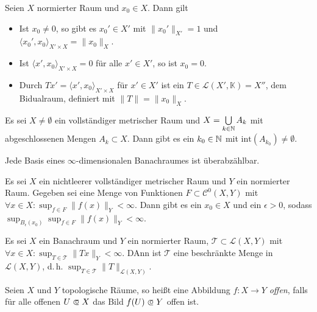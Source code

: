 \documentclass{cheat-sheet}
\newcommand{\K}{\mathbb{K}}
\newcommand{\Leb}{\mathcal{L}} %
\begin{document}
\begin{satz}
  Seien $X$ normierter Raum und $x_0 \in X$. Dann gilt
  \begin{itemize}
    \item  Ist $x_0 \not= 0$, so gibt es $x_0' \in X'$ mit $\|x_0'\|_{X'} = 1$ und $\langle x_0', x_0 \rangle_{X' \times X} = \|x_0\|_X$.
    \item Ist $\langle x', x_0 \rangle_{X' \times X} = 0$ für alle $x' \in X'$, so ist $x_0 = 0$.
    \item Durch $Tx' = \langle x', x_0 \rangle_{X' \times X}$ für $x' \in X'$ ist ein $T \in \mathcal{L}(X', \K) = X''$, dem Bidualraum, definiert mit $\|T\| = \|x_0\|_X$.
  \end{itemize}
\end{satz}



\begin{satz}
  Es sei $X \not= \emptyset$ ein vollständiger metrischer Raum und $X = \bigcup_{k \in \N} A_k$ mit abgeschlossenen Mengen $A_k \subset X$. Dann gibt es ein $k_0 \in \mathbb{N}$ mit $\mathrm{int}(A_{k_0}) \not= \emptyset$.
\end{satz}

\begin{kor}
  Jede Basis eines $\infty$-dimensionalen Banachraumes ist überabzählbar.
\end{kor}

\begin{satz}
  Es sei $X$ ein nichtleerer vollständiger metrischer Raum und $Y$ ein normierter Raum. Gegeben sei eine Menge von Funktionen $F \subset \mathcal{C}^0(X, Y)$ mit $\forall x \in X : \sup_{f \in F} \|f(x)\|_Y < \infty$. Dann gibt es ein $x_0 \in X$ und ein $\epsilon > 0$, sodass $\sup_{B_\epsilon(x_0)} \sup_{f \in F} \|f(x)\|_Y < \infty$.
\end{satz}

\begin{satz}
  Es sei $X$ ein Banachraum und $Y$ ein normierter Raum, $\mathcal{T} \subset \Leb(X, Y)$ mit $\forall x \in X : \sup_{T \in \mathcal{T}} \|Tx\|_Y < \infty$. DAnn ist $\mathcal{T}$ eine beschränkte Menge in $\Leb(X, Y)$, d.\,h. $\sup_{T \in \mathcal{T}} \|T\|_{\mathcal{L}(X, Y)}$.
\end{satz}

\begin{defn}
  Seien $X$ und $Y$ topologische Räume, so heißt eine Abbildung $f : X \to Y$ \emph{offen}, falls für alle offenen $U \opn X$ das Bild $f(U) \opn Y$ offen ist.
\end{defn}
\end{document}
